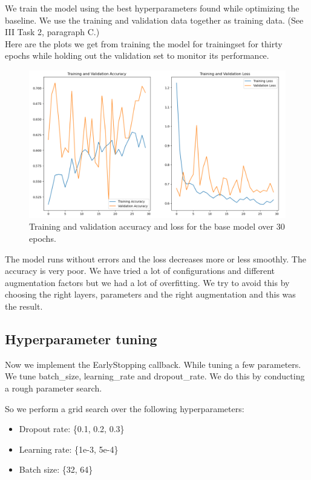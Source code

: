 \documentclass[conference]{IEEEtran}
\begin{document}
We train the model using the best hyperparameters found while optimizing the
baseline. We use the training and validation data together as training data. 
(See III Task 2, paragraph C.)\\



Here are the plots we get from training the model for trainingset for thirty epochs while holding out the
validation set to monitor its performance.\\

\begin{figure}[htbp]
	\centerline{\includegraphics[width=\linewidth]{Images/Transferlearning_1.png}}
	\caption{Training and validation accuracy and loss for the base model over 30 epochs.}
	\label{fig:baseline_curves}
\end{figure}

The model runs without errors and the loss decreases more or less smoothly. The accuracy is very poor. We have tried a lot of configurations and different augmentation factors but we had a lot of overfitting. We try to avoid this by choosing the right layers, parameters and the right augmentation and this was the result.\\



\subsection{Hyperparameter tuning}
Now we implement the EarlyStopping callback. While tuning a few parameters. We tune batch\_size, learning\_rate and dropout\_rate. We do this by conducting a rough parameter search.

So we perform a grid search over the following hyperparameters:
\begin{itemize}
	\item Dropout rate: \{0.1, 0.2, 0.3\}
	\item Learning rate: \{1e-3, 5e-4\}
	\item Batch size: \{32, 64\}
\end{itemize}
\end{document}
